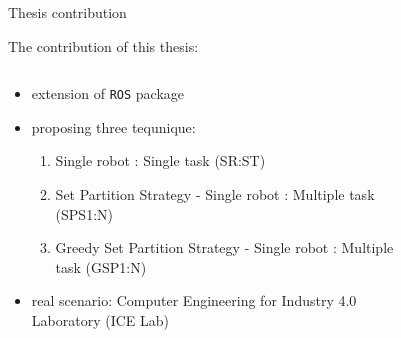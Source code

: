     \begin{frame}[fragile]{Thesis contribution}
        \begin{center}
        The contribution of this thesis:
        \end{center}
        \begin{columns}
            \begin{column}{.7\textwidth}
           
            \begin{itemize}
            \item extension of  \texttt{ROS}  package
            \item proposing three tequnique:
            \begin{enumerate}
                \item Single robot : Single task (SR:ST) 
                \item Set Partition Strategy - Single robot : Multiple task (SPS1:N)
                \item Greedy Set Partition Strategy - Single robot : Multiple task (GSP1:N)
            \end{enumerate}
                \item real scenario: Computer Engineering for Industry 4.0 Laboratory (ICE Lab) 
            \end{itemize}
            \end{column}
            \begin{column}{.4\textwidth}
            \begin{figure}
                \qquad
            \end{figure}
            \end{column}
        \end{columns}
    \end{frame}



